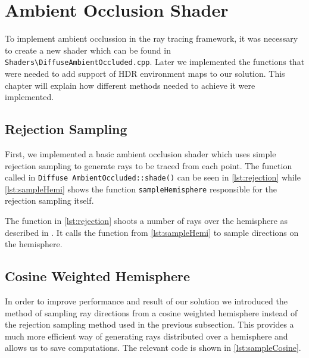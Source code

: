 \section{Ambient Occlusion Shader}
To implement ambient occlussion in the ray tracing framework, it was necessary to create a new shader which can be found in  \texttt{Shaders\textbackslash{}DiffuseAmbientOccluded.cpp}. Later we implemented the functions that were needed to add support of HDR environment maps to our solution. This chapter will explain how different  methods needed to achieve it were implemented.  

\subsection{Rejection Sampling}
\label{sec:rejection_sampling}

First, we implemented a basic ambient occlusion shader which uses simple rejection sampling to generate rays to be traced from each point. The function called in \texttt{Diffuse AmbientOccluded::shade()} can be seen in 	\autoref{lst:rejection} while \autoref{lst:sampleHemi} shows the function \texttt{sampleHemisphere} responsible for the rejection sampling itself.



The function in \autoref{lst:rejection} shoots a number of rays over the hemisphere as described in \cite{Gems17}. It calls the function from \autoref{lst:sampleHemi} to sample directions on the hemisphere.



\subsection{Cosine Weighted Hemisphere}
\label{sec:cosine_weighted}
In order to improve performance and result of our solution we introduced the method of sampling ray directions from a cosine weighted hemisphere instead of the rejection sampling method used in the previous subsection. This provides a much more efficient way of generating rays distributed over a hemisphere and allows us to save computations. The relevant code is shown in \autoref{lst:sampleCosine}.



